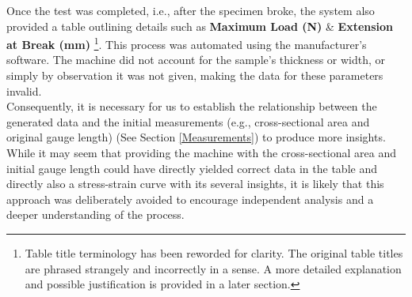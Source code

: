 \documentclass{article}
\begin{document}
Once the test was completed, i.e., after the specimen broke, the system also provided a table outlining details such as \textbf{Maximum Load (N)} \& \textbf{Extension at Break (mm)} \footnote{Table title terminology has been reworded for clarity. The original table titles are phrased strangely and incorrectly in a sense. A more detailed explanation and possible justification is provided in a later section.}. This process was automated using the manufacturer's software. The machine did not account for the sample's thickness or width, or simply by observation it was not given, making the data for these parameters invalid.\\[8pt]
Consequently, it is necessary for us to establish the relationship between the generated data and the initial measurements (e.g., cross-sectional area and original gauge length) (See Section \ref{Measurements}) to produce more insights. While it may seem that providing the machine with the cross-sectional area and initial gauge length could have directly yielded correct data in the table and directly also a stress-strain curve with its several insights, it is likely that this approach was deliberately avoided to encourage independent analysis and a deeper understanding of the process.
\end{document}

